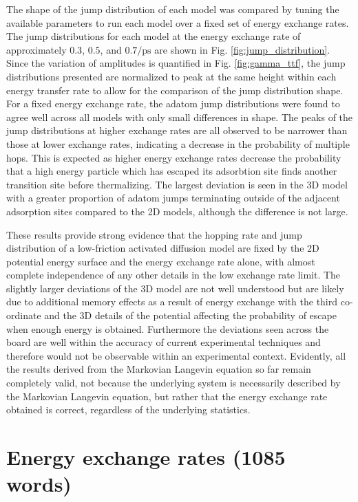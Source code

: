 \documentclass[7pt]{article}
\newcommand{\ips}{\si{\per\pico\second}}
\begin{document}
The shape of the jump distribution of each model was compared by tuning the available parameters to run each model over a fixed set of energy exchange rates. The jump distributions for each model at the energy exchange rate of approximately $0.3$, $0.5$, and $0.7\ips$ are shown in Fig. \ref{fig:jump_distribution}. Since the variation of amplitudes is quantified in Fig. \ref{fig:gamma_ttf}, the jump distributions presented are normalized to peak at the same height within each energy transfer rate to allow for the comparison of the jump distribution shape. For a fixed energy exchange rate, the adatom jump distributions were found to agree well across all models with only small differences in shape. The peaks of the jump distributions at higher exchange rates are all observed to be narrower than those at lower exchange rates, indicating a decrease in the probability of multiple hops\cite{Diamant}. This is expected as higher energy exchange rates decrease the probability that a high energy particle which has escaped its adsorbtion site finds another transition site before thermalizing. The largest deviation is seen in the 3D model with a greater proportion of adatom jumps terminating outside of the adjacent adsorption sites compared to the 2D models, although the difference is not large.  

These results provide strong evidence that the hopping rate and jump distribution of a low-friction activated diffusion model are fixed by the 2D potential energy surface and the energy exchange rate alone, with almost complete independence of any other details in the low exchange rate limit. The slightly larger deviations of the 3D model are not well understood but are likely due to additional memory effects as a result of energy exchange with the third co-ordinate and the 3D details of the potential affecting the probability of escape when enough energy is obtained. Furthermore the deviations seen across the board are well within the accuracy of current experimental techniques and therefore would not be observable within an experimental context. Evidently, all the results derived from the Markovian Langevin equation so far remain completely valid, not because the underlying system is necessarily described by the Markovian Langevin equation, but rather that the energy exchange rate obtained is correct, regardless of the underlying statistics.

\section*{Energy exchange rates (1085 words)}
\end{document}
